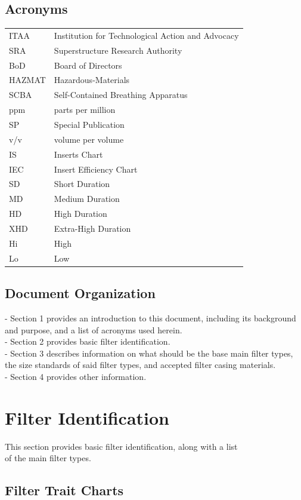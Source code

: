 \documentclass[a4paper, 12pt]{article}
\begin{document}
{	\subsection{Acronyms}
	\begin{tabular}{|p{2cm} p{10cm}}
		ITAA & Institution for Technological Action and Advocacy \\
		SRA & Superstructure Research Authority \\
		BoD & Board of Directors \\
		HAZMAT & Hazardous-Materials \\
		SCBA & Self-Contained Breathing Apparatus \\
		ppm & parts per million \\
		SP & Special Publication \\
		v/v & volume per volume \\
		IS & Inserts Chart \\
		IEC & Insert Efficiency Chart \\
		SD & Short Duration \\
		MD & Medium Duration \\
		HD & High Duration \\
		XHD & Extra-High Duration \\
		Hi & High \\
		Lo & Low \\
	\end{tabular}
		\subsection{Document Organization}
		- Section 1 provides an introduction to this document, including its background and
		purpose, and a list of acronyms used herein. \\
		- Section 2 provides basic filter identification. \\
		- Section 3 describes information on what should be the base main filter types, the size standards of said filter types, and accepted filter casing materials. \\
		- Section 4 provides other information.
			
	\newpage
			
	\section{Filter Identification}
		This section provides basic filter identification, along with a list \\
		of the main filter types.
	\subsection{Filter Trait Charts}
}
\end{document}
